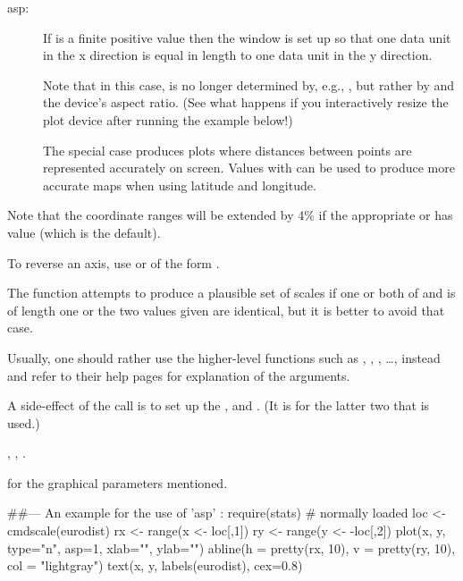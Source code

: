 \begin{Details}\relax
\begin{description}

\item[asp:] 
If  is a finite positive value then the window is
set up so that one data unit in the x direction is equal in length to
 \eqn{\times}{} one data unit in the y direction.

Note that in this case,  is no longer
determined by, e.g., , but rather by  and
the device's aspect ratio. (See what happens if you interactively
resize the plot device after running the example below!)

The special case  produces plots where distances
between points are represented accurately on screen.  Values with
 can be used to produce more accurate maps when using
latitude and longitude.

\end{description}


Note that the coordinate ranges will be extended by 4\% if the
appropriate   or  has value
 (which is the default).

To reverse an axis, use  or  of the form
.

The function attempts to produce a plausible set of scales if one or
both of  and  is of length one or the two values
given are identical, but it is better to avoid that case.

Usually, one should rather use the higher-level functions such as
, , , \dots,
instead and refer to their help pages for explanation of the
arguments.

A side-effect of the call is to set up the ,  and
 .  (It is for the latter two that
 is used.)
\end{Details}
%
\begin{SeeAlso}\relax
{},
,
.

 for the graphical parameters mentioned.
\end{SeeAlso}
%
\begin{Examples}
\begin{ExampleCode}
##--- An example for the use of 'asp' :
require(stats)  # normally loaded
loc <- cmdscale(eurodist)
rx <- range(x <- loc[,1])
ry <- range(y <- -loc[,2])
plot(x, y, type="n", asp=1, xlab="", ylab="")
abline(h = pretty(rx, 10), v = pretty(ry, 10), col = "lightgray")
text(x, y, labels(eurodist), cex=0.8)
\end{ExampleCode}
\end{Examples}
